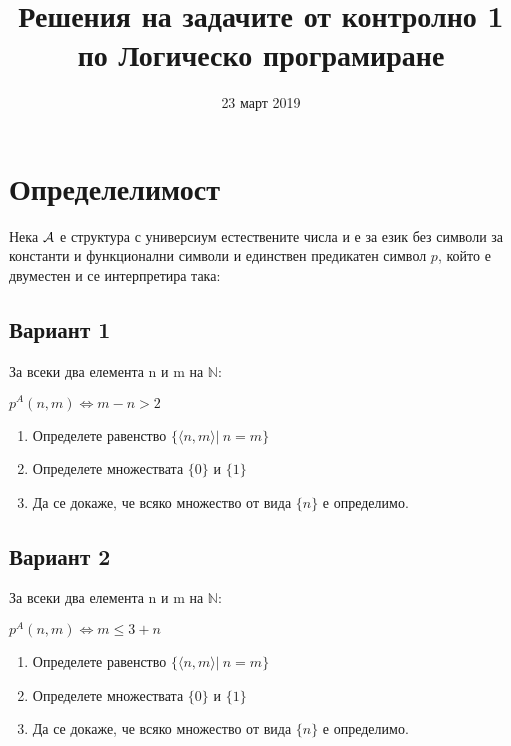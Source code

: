 \documentclass{article}
\title{Решения на задачите от контролно 1 по Логическо програмиране}
\date{23 март 2019}
\begin{document}
\maketitle

\section{Определелимост}
Нека ${\cal A}$ е структура с универсиум естествените числа и е за език без символи за константи и функционални
символи и единствен предикатен символ $p$, който е двуместен и се интерпретира така:
\subsection{Вариант 1}
За всеки два елемента n и m на $\mathbb{N}$:
\begin{center}
    $p^A(n, m) \iff m-n>2$
\end{center}

\begin{enumerate}[label=(\roman*)]
    \item Определете равенство $\{\langle n,m \rangle |\ n=m\}$
    \item Определете множествата $\{0\}$ и $\{1\}$
    \item Да се докаже, че всяко множество от вида $\{n\}$ е определимо.
\end{enumerate}

\subsection{Вариант 2}
За всеки два елемента n и m на $\mathbb{N}$:
\begin{center}
    $p^A(n, m) \iff m \leq 3 + n$
\end{center}

\begin{enumerate}[label=(\roman*)]
    \item Определете равенство $\{\langle n,m \rangle |\ n=m\}$
    \item Определете множествата $\{0\}$ и $\{1\}$
    \item Да се докаже, че всяко множество от вида $\{n\}$ е определимо.
\end{enumerate}

\newpage
\end{document}
